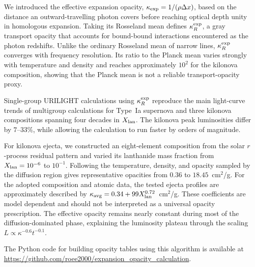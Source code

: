 \documentclass[final,5p,times,twocolumn]{elsarticle}
\begin{document}
We introduced the effective expansion opacity,
$\kappa_{\rm exp}=1/(\rho\Delta x)$, based on the distance an outward-travelling photon covers
before reaching optical depth unity in homologous expansion. Taking its Rosseland mean defines
$\kappa_R^{\rm exp}$, a gray transport opacity that accounts for bound-bound interactions
encountered as the photon redshifts. Unlike the ordinary Rosseland mean of narrow lines,
$\kappa_R^{\rm exp}$ converges with frequency resolution. Its ratio to the Planck mean varies
strongly with temperature and density and reaches approximately $10^2$ for the kilonova
composition, showing that the Planck mean is not a reliable transport-opacity proxy.

Single-group URILIGHT calculations using $\kappa_R^{\rm exp}$ reproduce the main light-curve trends
of multigroup calculations for Type~Ia supernova and three kilonova compositions spanning four
decades in $X_{\rm lan}$. The kilonova peak luminosities differ by $7$--$33\%$, while allowing the
calculation to run faster by orders of magnitude.

For kilonova ejecta, we constructed an eight-element composition from the solar $r$-process
residual pattern and varied its lanthanide mass fraction from $X_{\rm lan}=10^{-6}$ to $10^{-1}$.
Following the temperature, density, and opacity sampled by the diffusion region gives
representative opacities from $0.36$ to $18.45$~cm$^2$/g. For the adopted composition and atomic
data, the tested ejecta profiles are approximately described by
$\kappa_{\rm avg}=0.34+99X_{\rm lan}^{0.72}$~cm$^2$/g. These coefficients are model dependent and
should not be interpreted as a universal opacity prescription. The effective opacity remains
nearly constant during most of the diffusion-dominated phase, explaining the luminosity plateau
through the scaling $L\propto\kappa^{-0.6}t^{-0.1}$.

The Python code for building opacity tables using this algorithm is available at 
\url{https://github.com/roee2000/expansion_opacity_calculation}.



\end{document}
